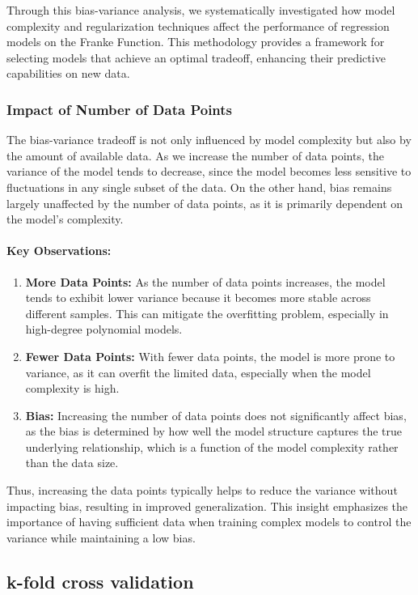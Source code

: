 \documentclass{article}
\begin{document}
\begin{enumerate}
Through this bias-variance analysis, we systematically investigated how model complexity and regularization techniques affect the performance of regression models on the Franke Function. This methodology provides a framework for selecting models that achieve an optimal tradeoff, enhancing their predictive capabilities on new data.


\subsubsection{Impact of Number of Data Points}

The bias-variance tradeoff is not only influenced by model complexity but also by the amount of available data. As we increase the number of data points, the variance of the model tends to decrease, since the model becomes less sensitive to fluctuations in any single subset of the data. On the other hand, bias remains largely unaffected by the number of data points, as it is primarily dependent on the model's complexity.

\paragraph{Key Observations:}
\begin{enumerate}
    \item \textbf{More Data Points:} As the number of data points increases, the model tends to exhibit lower variance because it becomes more stable across different samples. This can mitigate the overfitting problem, especially in high-degree polynomial models.
    \item \textbf{Fewer Data Points:} With fewer data points, the model is more prone to variance, as it can overfit the limited data, especially when the model complexity is high.
    \item \textbf{Bias:} Increasing the number of data points does not significantly affect bias, as the bias is determined by how well the model structure captures the true underlying relationship, which is a function of the model complexity rather than the data size.
\end{enumerate}

Thus, increasing the data points typically helps to reduce the variance without impacting bias, resulting in improved generalization. This insight emphasizes the importance of having sufficient data when training complex models to control the variance while maintaining a low bias.

\subsection{k-fold cross validation}


\end{enumerate}
\end{document}
